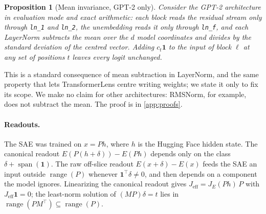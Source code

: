 \documentclass{article}
\theoremstyle{plain}
\newtheorem{proposition}[theorem]{Proposition}
\theoremstyle{definition}
\theoremstyle{remark}
\begin{document}
\begin{proposition}[Mean invariance, GPT-2 only]
\label{prop:admissible}
Consider the GPT-2 architecture in evaluation mode and exact arithmetic: each block reads
the residual stream only through \texttt{ln\_1} and \texttt{ln\_2}, the unembedding reads
it only through \texttt{ln\_f}, and each LayerNorm subtracts the mean over the $d$ model
coordinates and divides by the standard deviation of the centred vector. Adding
$c_t\mathbf{1}$ to the input of block $\ell$ at any set of positions $t$ leaves every logit
unchanged.
\end{proposition}
This is a standard consequence of mean subtraction in LayerNorm, and the same property that
lets TransformerLens centre writing weights; we state it only to fix its scope. We make no
claim for other architectures: RMSNorm, for example, does not subtract the mean. The proof is
in \cref{app:proofs}.

\paragraph{Readouts.} The SAE was trained on $x = Ph$, where $h$ is the Hugging Face hidden
state. The canonical readout $E(P(h+\delta)) - E(Ph)$ depends only on the class
$\delta+\operatorname{span}(\mathbf{1})$. The raw off-slice readout $E(x+\delta) - E(x)$
feeds the SAE an input outside $\operatorname{range}(P)$ whenever $\mathbf{1}^{\top}\delta\neq0$,
and then depends on a component the model ignores. Linearizing the canonical readout gives
$J_{\mathrm{eff}} = J_E(Ph)\,P$ with $J_{\mathrm{eff}}\mathbf{1} = 0$; the least-norm
solution of $(MP)\delta = t$ lies in $\operatorname{range}(PM^{\top})\subseteq
\operatorname{range}(P)$.
\end{document}
